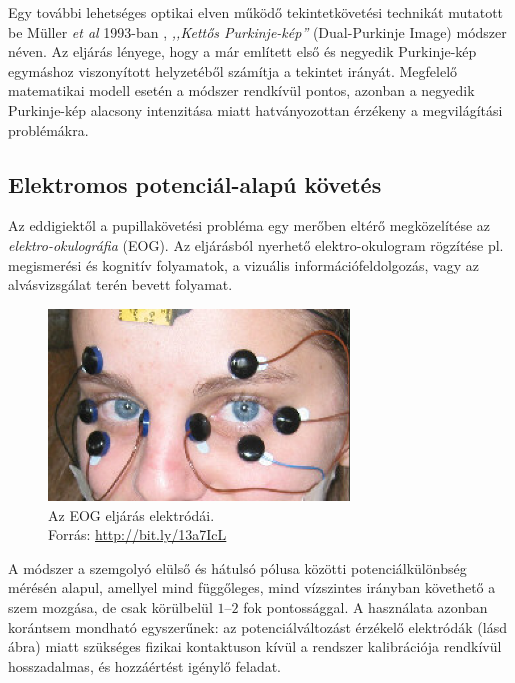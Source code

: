 Egy további lehetséges optikai elven működő tekintetkövetési technikát mutatott be Müller \emph{et al} 1993-ban \cite{muller}, \emph{,,Kettős Purkinje-kép''} (Dual-Purkinje Image) módszer néven. Az eljárás lényege, hogy a már említett első és negyedik Purkinje-kép egymáshoz viszonyított helyzetéből számítja a tekintet irányát. Megfelelő matematikai modell esetén a módszer rendkívül pontos, azonban a negyedik Purkinje-kép alacsony intenzitása miatt hatványozottan érzékeny a megvilágítási problémákra.

\subsection{Elektromos potenciál-alapú követés}\label{sect:potencial}

Az eddigiektől a pupillakövetési probléma egy merőben eltérő megközelítése az \emph{elektro-okulográfia} (EOG). Az eljárásból nyerhető elektro-okulogram rögzítése pl. megismerési és kognitív folyamatok, a vizuális információfeldolgozás, vagy az alvásvizsgálat terén bevett folyamat.

\begin{figure}[!ht]
\centering
\includegraphics[width=80mm, keepaspectratio]{figures/eog.png}
\caption{Az EOG eljárás elektródái.\\Forrás: \url{http://bit.ly/13a7IcL}}
\label{fig:eog}
\end{figure}

A módszer a szemgolyó elülső és hátulsó pólusa közötti potenciálkülönbség mérésén alapul, amellyel mind függőleges, mind vízszintes irányban követhető a szem mozgása, de csak körülbelül $1$--$2$ fok pontossággal. A használata azonban korántsem mondható egyszerűnek: az potenciálváltozást érzékelő elektródák (lásd  ábra) miatt szükséges fizikai kontaktuson kívül a rendszer kalibrációja rendkívül hosszadalmas, és hozzáértést igénylő feladat.

